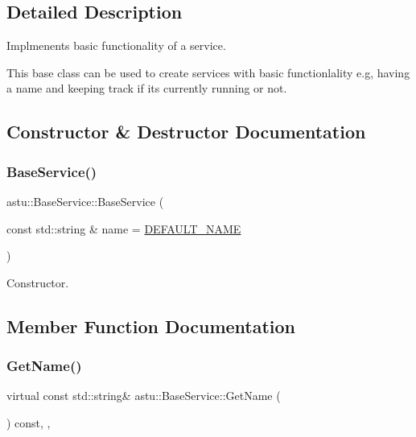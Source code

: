 \subsection{Detailed Description}
Implmenents basic functionality of a service.

This base class can be used to create services with basic functionlality e.\+g, having a name and keeping track if its currently running or not. 

\subsection{Constructor \& Destructor Documentation}
\mbox{\label{classastu_1_1BaseService_ab155c73d180c22dab7cf8aff1514b2b5}} 
\subsubsection{\texorpdfstring{Base\+Service()}{BaseService()}}
{\footnotesize\ttfamily astu\+::\+Base\+Service\+::\+Base\+Service (\begin{DoxyParamCaption}\item[{const std\+::string \&}]{name = {\ttfamily \hyperlink{classastu_1_1BaseService_a9483b26ad631bd14646ef2d2170cd828}{D\+E\+F\+A\+U\+L\+T\+\_\+\+N\+A\+ME}} }\end{DoxyParamCaption})}

Constructor. 

\subsection{Member Function Documentation}
\mbox{\label{classastu_1_1BaseService_a42eb6e0d667215ef635682d2a12e1631}} 
\subsubsection{\texorpdfstring{Get\+Name()}{GetName()}}
{\footnotesize\ttfamily virtual const std\+::string\& astu\+::\+Base\+Service\+::\+Get\+Name (\begin{DoxyParamCaption}{ }\end{DoxyParamCaption}) const\hspace{0.3cm}{\ttfamily [final]}, {\ttfamily [override]}, {\ttfamily [virtual]}}

